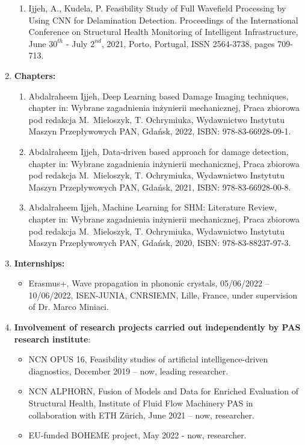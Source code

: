 \documentclass[11pt, a4paper]{article}
\begin{document}
\begin{enumerate}
\begin{enumerate}
			\item {Ijjeh, A.}, Kudela, P. Feasibility Study of Full Wavefield Processing by Using CNN for Delamination Detection. 
			Proceedings of the International Conference on Structural Health Monitoring of Intelligent
			Infrastructure, June \(30^{th}\) - July \(2^{nd}\), 2021, Porto, Portugal, ISSN 2564-3738, pages 709-713.
		\end{enumerate}	
		\item \textbf{Chapters:}
		\begin{enumerate}
			\item {Abdalraheem Ijjeh}, Deep Learning based Damage Imaging techniques, chapter in: Wybrane zagadnienia
			inżynierii mechanicznej, Praca zbiorowa pod redakcja M.~Mieloszyk, T. Ochrymiuka, Wydawnictwo Instytutu
			Maszyn Przepływowych PAN, Gdańsk, 2022, ISBN: 978-83-66928-09-1.
			\item {Abdalraheem Ijjeh}, Data-driven based approach for damage detection, chapter in: Wybrane zagadnienia
			inżynierii mechanicznej, Praca zbiorowa pod redakcja M.~Mieloszyk, T. Ochrymiuka, Wydawnictwo Instytutu
			Maszyn Przepływowych PAN, Gdańsk, 2021, ISBN: 978-83-66928-00-8.				
			\item {Abdalraheem Ijjeh}, Machine Learning for SHM: Literature Review, chapter in: Wybrane zagadnienia
			inżynierii mechanicznej, Praca zbiorowa pod redakcja M.~Mieloszyk, T. Ochrymiuka, Wydawnictwo Instytutu
			Maszyn Przepływowych PAN, Gdańsk, 2020, ISBN: 978-83-88237-97-3.
		\end{enumerate}
		\item \textbf{Internships:}
		\begin{itemize}
			\item Erasmus+, Wave propagation in phononic crystals, 05/06/2022 – 10/06/2022, ISEN-JUNIA, CNRSIEMN,
			Lille, France, under supervision of Dr. Marco Miniaci.
		\end{itemize}			
		\item \textbf{Involvement of research projects carried out independently by PAS research institute}:
		\begin{itemize}
			\item NCN OPUS 16, Feasibility studies of artificial intelligence-driven diagnostics, December 2019 – now, leading researcher.
			\item NCN ALPHORN, Fusion of Models and Data for Enriched Evaluation of Structural Health, Institute of Fluid Flow Machinery PAS in collaboration with ETH Zürich, June 2021 – now, researcher.
			\item EU-funded BOHEME project, May 2022 - now, researcher.

\end{itemize}
\end{enumerate}
\end{document}
